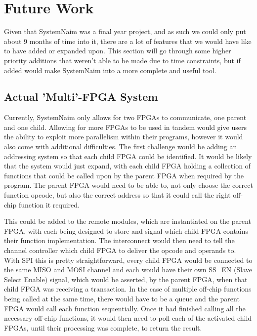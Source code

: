 \chapter{Future Work}

Given that SystemNaim was a final year project, and as such we could only put about 9 months of time into it, there are a lot of features that we would have like to have added or expanded upon. This section will go through some higher priority additions that weren't able to be made due to time constraints, but if added would make SystemNaim into a more complete and useful tool.

\section{Actual 'Multi'-FPGA System}

Currently, SystemNaim only allows for two FPGAs to communicate, one parent and one child. Allowing for more FPGAs to be used in tandem would give users the ability to exploit more parallelism within their programs, however it would also come with additional difficulties. The first challenge would be adding an addressing system so that each child FPGA could be identified. It would be likely that the system would just expand, with each child FPGA holding a collection of functions that could be called upon by the parent FPGA when required by the program. The parent FPGA would need to be able to, not only choose the correct function opcode, but also the correct address so that it could call the right off-chip function it required. 

This could be added to the remote modules, which are instantiated on the parent FPGA, with each being designed to store and signal which child FPGA contains their function implementation. The interconnect would then need to tell the channel controller which child FPGA to deliver the opcode and operands to. With SPI this is pretty straightforward, every child FPGA would be connected to the same MISO and MOSI channel and each would have their own SS\_EN (Slave Select Enable) signal, which would be asserted, by the parent FPGA, when that child FPGA was receiving a transaction. In the case of multiple off-chip functions being called at the same time, there would have to be a queue and the parent FPGA would call each function sequentially. Once it had finished calling all the necessary off-chip functions, it would then need to poll each of the activated child FPGAs, until their processing was complete, to return the result.

